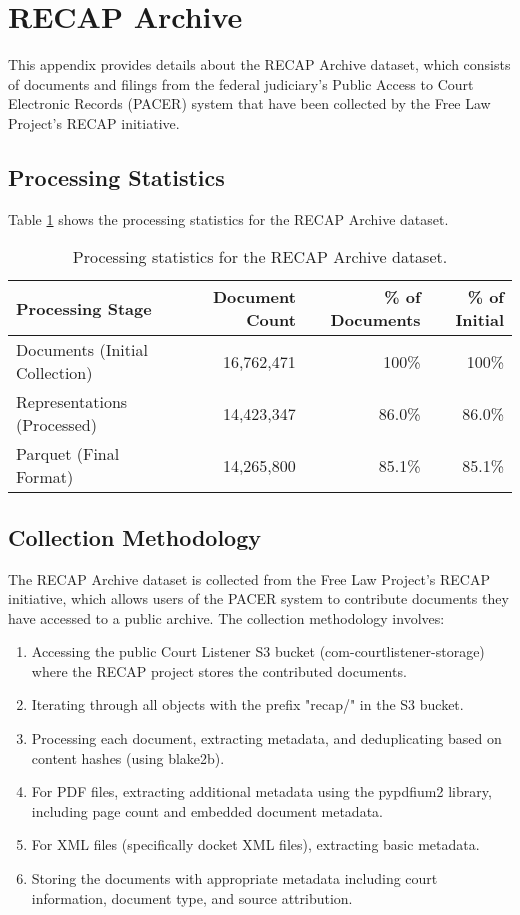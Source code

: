 \section{RECAP Archive}
\label{appendix:recap}

This appendix provides details about the RECAP Archive dataset, which consists of documents and filings from the federal judiciary's Public Access to Court Electronic Records (PACER) system that have been collected by the Free Law Project's RECAP initiative.

\subsection{Processing Statistics}

Table \ref{table:recap-stats} shows the processing statistics for the RECAP Archive dataset.

\begin{table}[h]
\centering
\begin{tabular}{|l|r|r|r|}
\hline
\textbf{Processing Stage} & \textbf{Document Count} & \textbf{\% of Documents} & \textbf{\% of Initial} \\
\hline
Documents (Initial Collection) & 16,762,471 & 100\% & 100\% \\
Representations (Processed) & 14,423,347 & 86.0\% & 86.0\% \\
Parquet (Final Format) & 14,265,800 & 85.1\% & 85.1\% \\
\hline
\end{tabular}
\caption{Processing statistics for the RECAP Archive dataset.}
\label{table:recap-stats}
\end{table}

\subsection{Collection Methodology}

The RECAP Archive dataset is collected from the Free Law Project's RECAP initiative, which allows users of the PACER system to contribute documents they have accessed to a public archive. The collection methodology involves:

\begin{enumerate}
    \item Accessing the public Court Listener S3 bucket (com-courtlistener-storage) where the RECAP project stores the contributed documents.
    \item Iterating through all objects with the prefix "recap/" in the S3 bucket.
    \item Processing each document, extracting metadata, and deduplicating based on content hashes (using blake2b).
    \item For PDF files, extracting additional metadata using the pypdfium2 library, including page count and embedded document metadata.
    \item For XML files (specifically docket XML files), extracting basic metadata.
    \item Storing the documents with appropriate metadata including court information, document type, and source attribution.
\end{enumerate}

